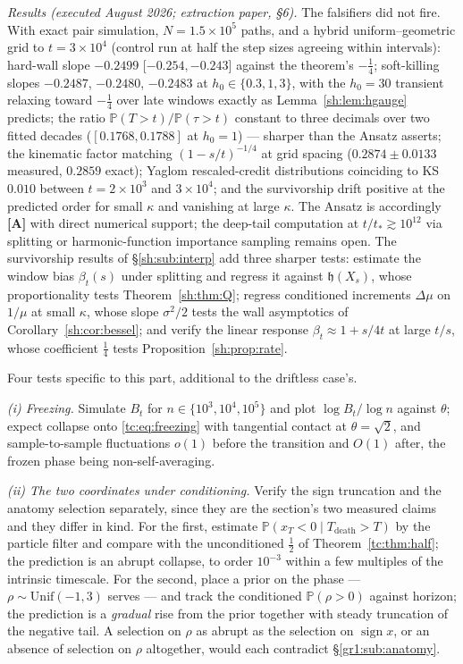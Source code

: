 \documentclass[11pt]{article}
\numberwithin{equation}{section}
\theoremstyle{plain}
\theoremstyle{definition}
\theoremstyle{remark}
\newcommand{\PP}{\mathbb{P}}
\newcommand{\hm}{\mathfrak{h}}
\begin{document}
\emph{Results (executed August 2026; extraction paper, \S6).} The
falsifiers did not fire. With exact pair simulation,
$N=1.5\times10^{5}$ paths, and a hybrid uniform--geometric grid to
$t=3\times10^{4}$ (control run at half the step sizes agreeing within
intervals): hard-wall slope $-0.2499$ [$-0.254,-0.243$] against the
theorem's $-\tfrac14$; soft-killing slopes $-0.2487$, $-0.2480$,
$-0.2483$ at $h_0\in\{0.3,1,3\}$, with the $h_0=30$ transient
relaxing toward $-\tfrac14$ over late windows exactly as
Lemma~\ref{sh:lem:hgauge} predicts; the ratio
$\PP(T>t)/\PP(\tau>t)$ constant to three decimals over two fitted
decades ($[0.1768,0.1788]$ at $h_0=1$) --- sharper than the Ansatz
asserts; the kinematic factor matching $(1-s/t)^{-1/4}$ at grid
spacing ($0.2874\pm0.0133$ measured, $0.2859$ exact); Yaglom
rescaled-credit distributions coinciding to KS $0.010$ between
$t=2\times10^{3}$ and $3\times10^{4}$; and the survivorship drift
positive at the predicted order for small $\kappa$ and vanishing at
large $\kappa$. The Ansatz is accordingly \textbf{[A]} with direct
numerical support; the deep-tail computation at
$t/t_*\gtrsim10^{12}$ via splitting or harmonic-function importance
sampling remains open. The survivorship results of
\S\ref{sh:sub:interp} add three sharper tests: estimate the window bias
$\beta_t(s)$ under splitting and regress it against $\hm(X_s)$, whose
proportionality tests Theorem~\ref{sh:thm:Q}; regress conditioned
increments $\Delta\mu$ on $1/\mu$ at small $\kappa$, whose slope
$\sigma^2/2$ tests the wall asymptotics of
Corollary~\ref{sh:cor:bessel}; and verify the linear response
$\beta_t\approx1+s/4t$ at large $t/s$, whose coefficient $\tfrac14$ tests
Proposition~\ref{sh:prop:rate}.

\label{tc:sub:numerics}

Four tests specific to this part, additional to the driftless case's.

\emph{(i) Freezing.} Simulate $B_t$ for $n\in\{10^{3},10^{4},10^{5}\}$
and plot $\log B_t/\log n$ against $\theta$; expect collapse onto
\eqref{tc:eq:freezing} with tangential contact at $\theta=\sqrt2$, and
sample-to-sample fluctuations $o(1)$ before the transition and $O(1)$
after, the frozen phase being non-self-averaging.

\emph{(ii) The two coordinates under conditioning.} Verify the sign
truncation and the anatomy selection separately, since they are the
section's two measured claims and they differ in kind. For the first,
estimate $\PP(x_T<0\mid T_{\text{death}}>T)$ by the particle filter and
compare with the unconditioned $\tfrac12$ of
Theorem~\ref{tc:thm:half}; the prediction is an abrupt collapse, to
order $10^{-3}$ within a few multiples of the intrinsic timescale. For
the second, place a prior on the phase --- $\rho\sim
\mathrm{Unif}(-1,3)$ serves --- and track the conditioned
$\PP(\rho>0)$ against horizon; the prediction is a \emph{gradual} rise
from the prior together with steady truncation of the negative tail. A
selection on $\rho$ as abrupt as the selection on $\operatorname{sign}
x$, or an absence of selection on $\rho$ altogether, would each
contradict \S\ref{gr1:sub:anatomy}.
\end{document}
